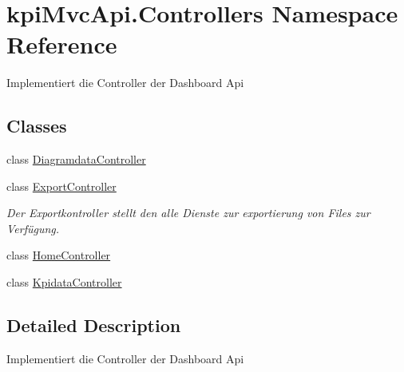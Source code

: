 \hypertarget{namespacekpi_mvc_api_1_1_controllers}{}\section{kpi\+Mvc\+Api.\+Controllers Namespace Reference}
\label{namespacekpi_mvc_api_1_1_controllers}


Implementiert die Controller der Dashboard Api  


\subsection*{Classes}
\begin{DoxyCompactItemize}
\item 
class \hyperlink{classkpi_mvc_api_1_1_controllers_1_1_diagramdata_controller}{Diagramdata\+Controller}
\item 
class \hyperlink{classkpi_mvc_api_1_1_controllers_1_1_export_controller}{Export\+Controller}
\begin{DoxyCompactList}\small\item\em Der Exportkontroller stellt den alle Dienste zur exportierung von Files zur Verfügung. \end{DoxyCompactList}\item 
class \hyperlink{classkpi_mvc_api_1_1_controllers_1_1_home_controller}{Home\+Controller}
\item 
class \hyperlink{classkpi_mvc_api_1_1_controllers_1_1_kpidata_controller}{Kpidata\+Controller}
\end{DoxyCompactItemize}


\subsection{Detailed Description}
Implementiert die Controller der Dashboard Api 

